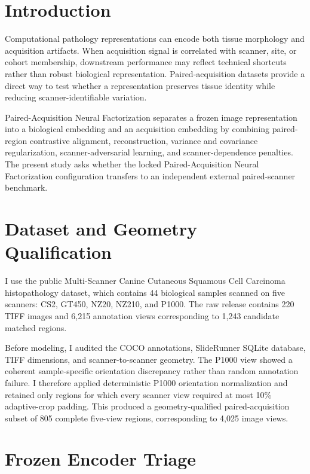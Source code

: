 \documentclass[10pt]{article}
\begin{document}
\vspace{0.28in}
\section{Introduction}

Computational pathology representations can encode both tissue morphology and acquisition artifacts. When acquisition signal is correlated with scanner, site, or cohort membership, downstream performance may reflect technical shortcuts rather than robust biological representation. Paired-acquisition datasets provide a direct way to test whether a representation preserves tissue identity while reducing scanner-identifiable variation.

Paired-Acquisition Neural Factorization separates a frozen image representation into a biological embedding and an acquisition embedding by combining paired-region contrastive alignment, reconstruction, variance and covariance regularization, scanner-adversarial learning, and scanner-dependence penalties. The present study asks whether the locked Paired-Acquisition Neural Factorization configuration transfers to an independent external paired-scanner benchmark.

\section{Dataset and Geometry Qualification}

I use the public Multi-Scanner Canine Cutaneous Squamous Cell Carcinoma histopathology dataset, which contains 44 biological samples scanned on five scanners: CS2, GT450, NZ20, NZ210, and P1000. The raw release contains 220 TIFF images and 6,215 annotation views corresponding to 1,243 candidate matched regions.

Before modeling, I audited the COCO annotations, SlideRunner SQLite database, TIFF dimensions, and scanner-to-scanner geometry. The P1000 view showed a coherent sample-specific orientation discrepancy rather than random annotation failure. I therefore applied deterministic P1000 orientation normalization and retained only regions for which every scanner view required at most 10\% adaptive-crop padding. This produced a geometry-qualified paired-acquisition subset of 805 complete five-view regions, corresponding to 4,025 image views.

\section{Frozen Encoder Triage}
\end{document}
